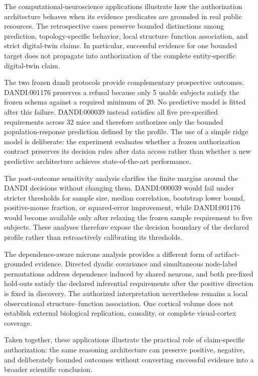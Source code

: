 \documentclass[11pt,a4paper]{article}
\begin{document}
The computational-neuroscience applications illustrate how the authorization
architecture behaves when its evidence predicates are grounded in real public
resources. The retrospective cases preserve bounded distinctions among
prediction, topology-specific behavior, local structure--function association,
and strict digital-twin claims. In particular, successful evidence for one
bounded target does not propagate into authorization of the complete
entity-specific digital-twin claim.

The two frozen \ac{dandi} protocols provide complementary prospective
outcomes. DANDI:001176 preserves a refusal because only 5 usable subjects
satisfy the frozen schema against a required minimum of 20. No predictive
model is fitted after this failure. DANDI:000039 instead satisfies all five
pre-specified requirements across 32 mice and therefore authorizes only the
bounded population-response prediction defined by the profile. The use of a
simple ridge model is deliberate: the experiment evaluates whether a frozen
authorization contract preserves its decision rules after data access rather
than whether a new predictive architecture achieves state-of-the-art
performance.

The post-outcome sensitivity analysis clarifies the finite margins around the
DANDI decisions without changing them. DANDI:000039 would fail under stricter
thresholds for sample size, median correlation, bootstrap lower bound,
positive-mouse fraction, or squared-error improvement, while DANDI:001176
would become available only after relaxing the frozen sample requirement to
five subjects. These analyses therefore expose the decision boundary of the
declared profile rather than retroactively calibrating its thresholds.

The dependence-aware \ac{microns} analysis provides a different form of
artifact-grounded evidence. Directed dyadic covariance and simultaneous
node-label permutations address dependence induced by shared neurons, and
both pre-fixed hold-outs satisfy the declared inferential requirements after
the positive direction is fixed in discovery. The authorized interpretation
nevertheless remains a local observational structure--function association.
One cortical volume does not establish external biological replication,
causality, or complete visual-cortex coverage.

Taken together, these applications illustrate the practical role of
claim-specific authorization: the same reasoning architecture can preserve
positive, negative, and deliberately bounded outcomes without converting
successful evidence into a broader scientific conclusion.
\end{document}
